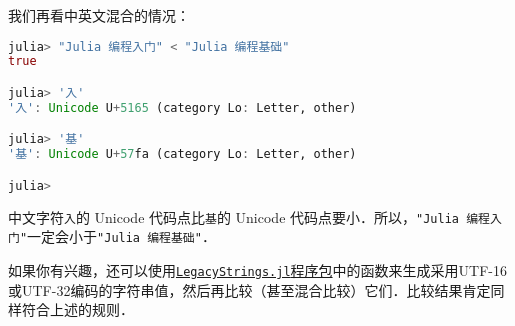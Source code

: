 我们再看中英文混合的情况：
\begin{lstlisting}[language=julia]
julia> "Julia 编程入门" < "Julia 编程基础"
true

julia> '入'
'入': Unicode U+5165 (category Lo: Letter, other)

julia> '基'
'基': Unicode U+57fa (category Lo: Letter, other)

julia> 
\end{lstlisting}

中文字符\verb|入|的 Unicode 代码点比\verb|基|的 Unicode 代码点要小．所以，\verb|"Julia 编程入门"|一定会小于\verb|"Julia 编程基础"|．

如果你有兴趣，还可以使用\href{https://github.com/JuliaStrings/LegacyStrings.jl}{\verb|LegacyStrings.jl|程序包}中的函数来生成采用UTF-16或UTF-32编码的字符串值，然后再比较（甚至混合比较）它们．比较结果肯定同样符合上述的规则．
